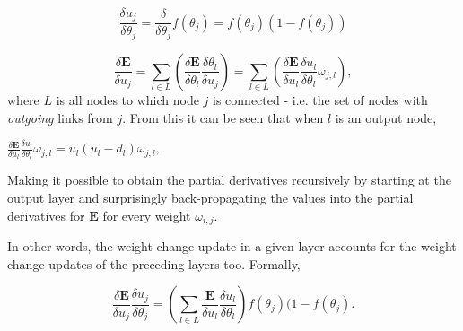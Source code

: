 \begin{equation}
    \frac{\delta u_j}{\delta \theta_j} = \frac{\delta}{\delta \theta_j} f(\theta_j) = f(\theta_j)(1-f(\theta_j))
\end{equation}

\begin{equation}
    \frac{\delta \textbf{E}}{\delta u_j} = \sum_{l \in L}(\frac{\delta \textbf{E}}{\delta \theta_l} 
    \frac{\delta \theta_l}{\delta u_j})
    = \sum_{l \in L}(\frac{\delta \textbf{E}}{\delta u_l} \frac{\delta u_l}{\delta \theta_l} \omega_{j,l}),
\end{equation}
where $L$ is all nodes to which node $j$ is connected - i.e. the set of nodes with \textit{outgoing} links from $j$. From this it can be seen that when $l$ is an output node,

\begin{center}
\begin{math}
    \frac{\delta \textbf{E}}{\delta u_l} \frac{\delta u_l}{\delta \theta_l} \omega_{j,l} = 
    u_l (u_l - d_l) \omega_{j,l},
\end{math}
\end{center}
Making it possible to obtain the partial derivatives recursively by starting at the output layer and surprisingly back-propagating the values into the partial derivatives for $\textbf{E}$ for every weight $\omega_{i,j}$.

In other words, the weight change update in a given layer accounts for the weight change updates of the preceding layers too. Formally,

\begin{equation}\label{recursive_derivative_error_activation_input}
    \frac{\delta \textbf{E}}{\delta u_j}\frac{\delta u_j}{\delta \theta_j} = 
    (\sum_{l \in L}\frac{\textbf{E}}{\delta u_l}\frac{\delta u_l}{\delta \theta_l}) f(\theta_j)(1-f(\theta_j).
\end{equation}

